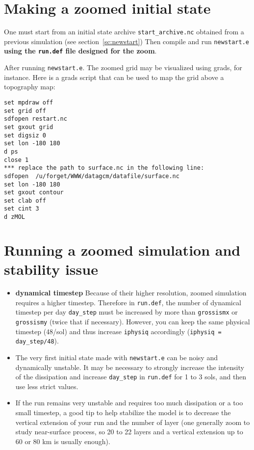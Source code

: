 \section{Making a zoomed initial state}

One must start from an initial state archive {\tt start\_archive.nc}
obtained from a previous
simulation (see section~\ref{sc:newstart})
Then compile and run {\tt newstart.e} {\bf using the {\tt run.def}
file designed for the zoom}.

After running {\tt newstart.e}. The zoomed grid may be visualized
using grads, for instance.
Here is a grads script that can be used to map the grid above a topography
map:

\begin{verbatim}
set mpdraw off
set grid off
sdfopen restart.nc
set gxout grid
set digsiz 0
set lon -180 180
d ps
close 1
*** replace the path to surface.nc in the following line:
sdfopen  /u/forget/WWW/datagcm/datafile/surface.nc
set lon -180 180
set gxout contour
set clab off
set cint 3
d zMOL
\end{verbatim}


\section{Running a zoomed simulation and stability issue}

\begin{itemize}

\item {\bf dynamical timestep}
Because of their higher resolution, zoomed simulation requires a higher
timestep.
Therefore in {\tt run.def}, the number of dynamical timestep per day
{\tt day\_step} must be increased by more than {\tt grossismx} or
{\tt grossismy} (twice that if necessary).
However, you can keep the same physical timestep (48/sol) and thus increase
 {\tt iphysiq} accordingly ({\tt iphysiq = day\_step/48}).


\item The very first initial state made with {\tt newstart.e} can be noisy and
dynamically unstable.
It may be necessary to strongly increase the intensity of the
dissipation and increase {\tt day\_step} in {\tt run.def} for 1 to 3 sols,
and then use less strict values. 

\item If the run remains very unstable and requires too much dissipation
or a too small timestep, a good tip to help stabilize the model
is to decrease the vertical extension of your run and the number of
layer (one generally zoom to study near-surface process, so 20 to 22
layers and a vertical extension up to 60 or 80 km is usually enough).

\end{itemize}













 



